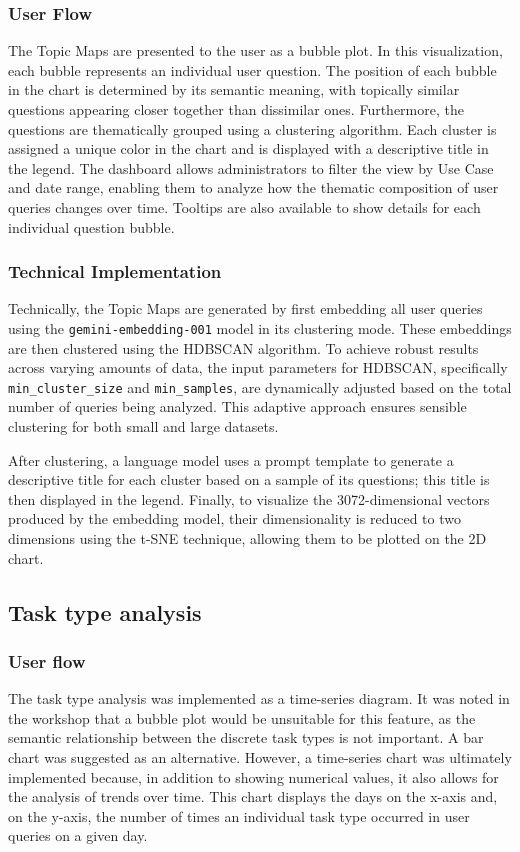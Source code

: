 \documentclass[
	english,
	ruledheaders=section,%
	class=report,%
	thesis={type=bachelor},%
	accentcolor=1b,%
	custommargins=true,%
	marginpar=false,%
	parskip=half-,%
	fontsize=11pt,%
	DIV=14,
]{tudapub}
\begin{document}
\subsubsection{User Flow}
The Topic Maps are presented to the user as a bubble plot. In this visualization, each bubble represents an individual user question. The position of each bubble in the chart is determined by its semantic meaning, with topically similar questions appearing closer together than dissimilar ones. Furthermore, the questions are thematically grouped using a clustering algorithm. Each cluster is assigned a unique color in the chart and is displayed with a descriptive title in the legend. The dashboard allows administrators to filter the view by Use Case and date range, enabling them to analyze how the thematic composition of user queries changes over time. Tooltips are also available to show details for each individual question bubble.

\subsubsection{Technical Implementation}
Technically, the Topic Maps are generated by first embedding all user queries using the \texttt{gemini-embedding-001} model in its clustering mode. These embeddings are then clustered using the HDBSCAN algorithm. To achieve robust results across varying amounts of data, the input parameters for HDBSCAN, specifically \texttt{min\_cluster\_size} and \texttt{min\_samples}, are dynamically adjusted based on the total number of queries being analyzed. This adaptive approach ensures sensible clustering for both small and large datasets.

After clustering, a language model uses a prompt template to generate a descriptive title for each cluster based on a sample of its questions; this title is then displayed in the legend. Finally, to visualize the 3072-dimensional vectors produced by the embedding model, their dimensionality is reduced to two dimensions using the t-SNE technique, allowing them to be plotted on the 2D chart.
\subsection{Task type analysis}
\subsubsection{User flow}
The task type analysis was implemented as a time-series diagram. It was noted in the workshop that a bubble plot would be unsuitable for this feature, as the semantic relationship between the discrete task types is not important. A bar chart was suggested as an alternative. However, a time-series chart was ultimately implemented because, in addition to showing numerical values, it also allows for the analysis of trends over time. This chart displays the days on the x-axis and, on the y-axis, the number of times an individual task type occurred in user queries on a given day.
\end{document}
